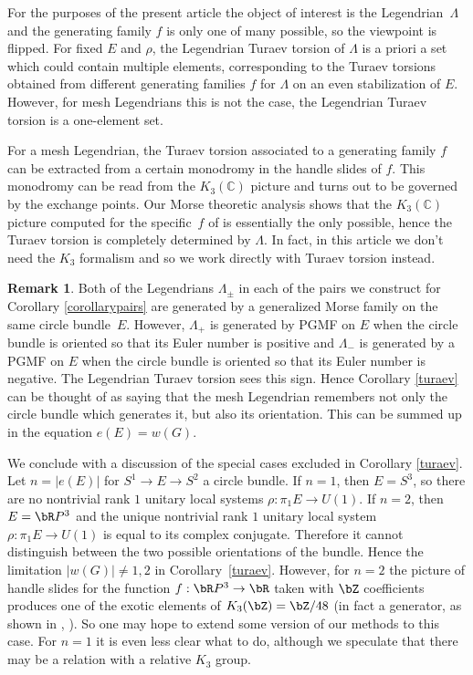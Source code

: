 \documentclass[JEP,XML,SOM,Unicode,NoFloatCountersInSection]{cedram}
\theoremstyle{plain}
\theoremstyle{definition}
\newtheorem{remark}[theorem]{Remark}
\newcommand{\bC}{\mathbb{C}}\newcommand{\bD}{\mathbb{D}}
\begin{document}
For the purposes of the present article the object of interest is the Legendrian~$\Lambda$ and the generating family $f$ is only one of many possible, so the viewpoint is flipped. For fixed $E$ and $\rho$, the Legendrian Turaev torsion of $\Lambda$ is a priori a set which could contain multiple elements, corresponding to the Turaev torsions obtained from different generating families $f$ for $\Lambda$ on an even stabilization of $E$. However, for mesh Legendrians this is not the case, the Legendrian Turaev torsion is a one-element set.

For a mesh Legendrian, the Turaev torsion associated to a generating family $f$ can be extracted from a certain monodromy in the handle slides of $f$. This monodromy can be read from the $K_3(\bC)$ picture and turns out to be governed by the exchange points. Our Morse theoretic analysis shows that the $K_3(\bC)$ picture computed for the specific~$f$ of \cite{IK93} is essentially the only possible, hence the Turaev torsion is completely determined by $\Lambda$. In fact, in this article we don't need the $K_3$ formalism and so we work directly with Turaev torsion instead.

\begin{remark} Both of the Legendrians $\Lambda_{\pm}$ in each of the pairs we construct for Corollary \ref{corollarypairs} are generated by a generalized Morse family on the same circle bundle~$E$. However, $\Lambda_+$ is generated by PGMF on $E$ when the circle bundle is oriented so that its Euler number is positive and $\Lambda_-$ is generated by a PGMF on $E$ when the circle bundle is oriented so that its Euler number is negative. The Legendrian Turaev torsion sees this sign. Hence Corollary \ref{turaev} can be thought of as saying that the mesh Legendrian remembers not only the circle bundle which generates it, but also its orientation. This can be summed up in the equation $e(E)=w(G)$.
\end{remark}

We conclude with a discussion of the special cases excluded in Corollary \ref{turaev}. Let $n=|e(E)|$ for $S^1 \to E \to S^2$ a circle bundle. If $n=1$, then $E=S^3$, so there are no nontrivial rank $1$ unitary local systems $\rho: \pi_1E \to U(1)$. If $n=2$, then $E=\bR P^3$ and the unique nontrivial rank $1$ unitary local system $\rho : \pi_1E \to U(1)$ is equal to its complex conjugate. Therefore it cannot distinguish between the two possible orientations of the bundle. Hence the limitation $|w(G)| \neq 1,2$ in Corollary~\ref{turaev}. However, for $n=2$ the picture of handle slides for the function $f:\bR P^3 \to \bR$ taken with $\bZ$ coefficients produces one of the exotic elements of $K_3(\bZ)=\bZ/48$ (in fact a generator, as shown in \cite{IK93a}, \cite{IK93}). So one may hope to extend some version of our methods to this case. For $n=1$ it is even less clear what to do, although we speculate that there may be a relation with a relative $K_3$ group.
\end{document}
